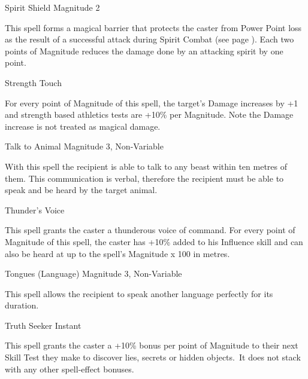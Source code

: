 \begin{rpg-spell}
{Spirit Shield}
{Magnitude 2}

This spell forms a magical barrier that protects the caster from Power Point loss as the result of a successful attack during Spirit Combat (see page \pageref{ssec:spirit-combat}). Each two points of Magnitude reduces the damage done by an attacking spirit by one point.
\end{rpg-spell}


\begin{rpg-spell}
{Strength}
{Touch}

For every point of Magnitude of this spell, the target’s Damage increases by +1 and strength based athletics tests are +10\% per Magnitude. Note the Damage increase is not treated as magical damage.
\end{rpg-spell}


\begin{rpg-spell}
{Talk to Animal}
{Magnitude 3, Non-Variable}

With this spell the recipient is able to talk to any beast within ten metres of them. This communication is verbal, therefore the recipient must be able to speak and be heard by the target animal. 
\end{rpg-spell}


\begin{rpg-spell}
{Thunder's Voice}
{}

This spell grants the caster a thunderous voice of command. For every point of Magnitude of this spell, the caster has +10\% added to his Influence skill and can also be heard at up to the spell’s Magnitude x 100 in metres.
\end{rpg-spell}


\begin{rpg-spell}
{Tongues (Language)}
{Magnitude 3, Non-Variable} %

This spell allows the recipient to speak another language perfectly for its duration. %
\end{rpg-spell}


\begin{rpg-spell}
{Truth Seeker}
{Instant}

This spell grants the caster a +10\% bonus per point of Magnitude to their next Skill Test they make to discover lies, secrets or hidden objects. It does not stack with any other spell-effect bonuses.
\end{rpg-spell}


